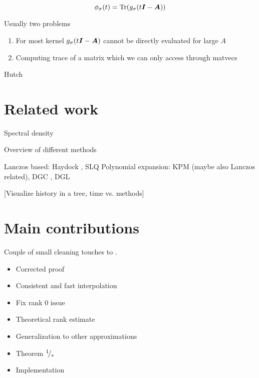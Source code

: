 \begin{equation}
    \phi_{\sigma}(t) = \operatorname{Tr}(g_{\sigma}(t\boldsymbol{I} - \boldsymbol{A})) 
    \label{equ:1-introduction-spectral-density-as-trace}
\end{equation}

Usually two problems

\begin{enumerate}
    \item For most kernel $g_{\sigma}(t\boldsymbol{I} - \boldsymbol{A})$ cannot be directly evaluated for large $A$
    \item Computing trace of a matrix which we can only access through matvecs
\end{enumerate}

Hutch\pp


\section{Related work}
\label{sec:1-introduction-related}

Spectral density \cite{lin2017randomized}

Overview of different methods 

Lanczos based: Haydock \cite{lin2016review}, SLQ \cite{chen2021slq}
Polynomial expansion: KPM \cite{weisse2006kpm} (maybe also Lanczos related), DGC \cite{lin2017randomized}, DGL \cite{lin2016review}

[Visualize history in a tree, time vs. methods]


\section{Main contributions}
\label{sec:1-introduction-contributions}

Couple of small cleaning touches to \cite{lin2017randomized}.

\begin{itemize}
    \item Corrected proof
    \item Consistent and fast interpolation
    \item Fix rank 0 issue
    \item Theoretical rank estimate
    \item Generalization to other approximations
    \item Theorem ${}^{1}\!/_{\epsilon}$
    \item Implementation
\end{itemize}

